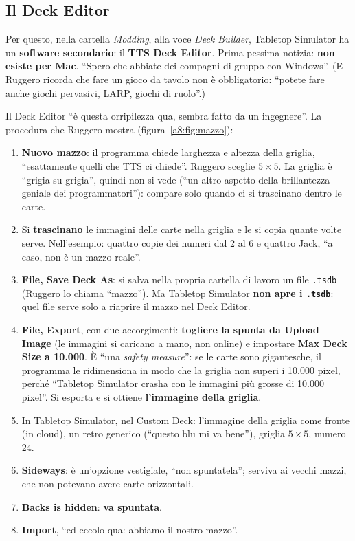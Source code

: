 \subsection{Il Deck Editor}
\label{a8:sec:deck-editor}

Per questo, nella cartella \emph{Modding}, alla voce \emph{Deck Builder}, Tabletop
Simulator ha un \textbf{software secondario}: il \textbf{TTS Deck Editor}. Prima
pessima notizia: \textbf{non esiste per Mac}. ``Spero che abbiate dei compagni di gruppo
con Windows''. (E Ruggero ricorda che fare un gioco da tavolo non è obbligatorio:
``potete fare anche giochi pervasivi, LARP, giochi di ruolo''.)

Il Deck Editor ``è questa orripilezza qua, sembra fatto da un ingegnere''. La
procedura che Ruggero mostra (figura~\ref{a8:fig:mazzo}):
\begin{enumerate}
  \item \textbf{Nuovo mazzo}: il programma chiede larghezza e altezza della griglia,
        ``esattamente quelli che TTS ci chiede''. Ruggero sceglie $5\times5$. La
        griglia è ``grigia su grigia'', quindi non si vede (``un altro aspetto della
        brillantezza geniale dei programmatori''): compare solo quando ci si
        trascinano dentro le carte.
  \item Si \textbf{trascinano} le immagini delle carte nella griglia e le si copia
        quante volte serve. Nell'esempio: quattro copie dei numeri dal 2 al 6 e
        quattro Jack, ``a caso, non è un mazzo reale''.
  \item \textbf{File, Save Deck As}: si salva nella propria cartella di lavoro un file
        \texttt{.tsdb} (Ruggero lo chiama ``mazzo''). Ma Tabletop Simulator
        \textbf{non apre i \texttt{.tsdb}}: quel file serve solo a riaprire il mazzo nel
        Deck Editor.
  \item \textbf{File, Export}, con due accorgimenti: \textbf{togliere la spunta da
        Upload Image} (le immagini si caricano a mano, non online) e impostare
        \textbf{Max Deck Size a 10.000}. È ``una \emph{safety measure}'': se le carte
        sono gigantesche, il programma le ridimensiona in modo che la griglia non
        superi i 10.000 pixel, perché ``Tabletop Simulator crasha con le immagini più
        grosse di 10.000 pixel''. Si esporta e si ottiene \textbf{l'immagine della
        griglia}.
  \item In Tabletop Simulator, nel Custom Deck: l'immagine della griglia come fronte
        (in cloud), un retro generico (``questo blu mi va bene''), griglia $5\times5$,
        numero 24.
  \item \textbf{Sideways}: è un'opzione vestigiale, ``non spuntatela''; serviva ai
        vecchi mazzi, che non potevano avere carte orizzontali.
  \item \textbf{Backs is hidden}: \textbf{va spuntata}.
  \item \textbf{Import}, ``ed eccolo qua: abbiamo il nostro mazzo''.
\end{enumerate}

